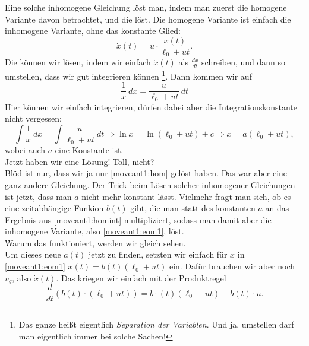 \begin{Answer}[ref = moveant]
	Eine solche inhomogene Gleichung löst man, indem man zuerst die homogene Variante davon betrachtet, und die löst. Die homogene Variante ist einfach die inhomogene Variante, ohne das konstante Glied:
	\begin{equation}\label{moveant1:hom}
		\dot{x}\left(t\right) = u\cdot \frac{x\left(t\right)}{\ell_0 + u t}.
	\end{equation}
	Die können wir lösen, indem wir einfach $\dot{x}\left(t\right)$ als $\frac{dx}{dt}$ schreiben, und dann so \glqq umstellen\grqq, dass wir gut integrieren können \footnote{Das ganze heißt eigentlich \textit{Separation der Variablen}. Und ja, umstellen darf man eigentlich immer bei solche Sachen!}. Dann kommen wir auf
	\begin{equation*}
		\frac{1}{x}~dx = \frac{u}{\ell_0 + u t}~dt
	\end{equation*}
	Hier können wir einfach integrieren, dürfen dabei aber die Integrationskonstante nicht vergessen:
	\begin{equation}\label{moveant1:homint}
		\int \frac{1}{x}~dx = \int \frac{u}{\ell_0+ut}~dt \Rightarrow \ln x = \ln \left(\ell_0 + ut\right) +c \Rightarrow x = a \left(\ell_0 + u t\right),
	\end{equation}
	wobei auch $a$ eine Konstante ist.\\
	Jetzt haben wir eine Lösung! Toll, nicht?\\
	Blöd ist nur, dass wir ja nur \eqref{moveant1:hom} gelöst haben. Das war aber eine ganz andere Gleichung. Der Trick beim Lösen solcher inhomogener Gleichungen ist jetzt, dass man $a$ nicht mehr konstant lässt. Vielmehr fragt man sich, ob es eine zeitabhängige Funkion $b\left(t\right)$ gibt, die man statt des konstanten $a$ an das Ergebnis aus \eqref{moveant1:homint} multipliziert, sodass man damit aber die inhomogene Variante, also \eqref{moveant1:eom1}, löst.\\
	Warum das funktioniert, werden wir gleich sehen.\\
	Um dieses neue $a\left(t\right)$ jetzt zu finden, setzten wir einfach für $x$ in \eqref{moveant1:eom1} $x\left(t\right) = b\left(t\right) \left(\ell_0 + u t\right) $ ein. Dafür brauchen wir aber noch $v_g$, also $\dot{x}\left(t\right)$. Das kriegen wir einfach mit der Produktregel
	\begin{equation}\label{moveant1:prodrule}
		\frac{d}{dt}\left(b\left(t\right)\cdot\left(\ell_0 + u t\right)\right) = \dot{b}\cdot \left(t\right) \left(\ell_0 + u t\right)  + b\left(t\right)  \cdot u.
	\end{equation}

\end{Answer}
